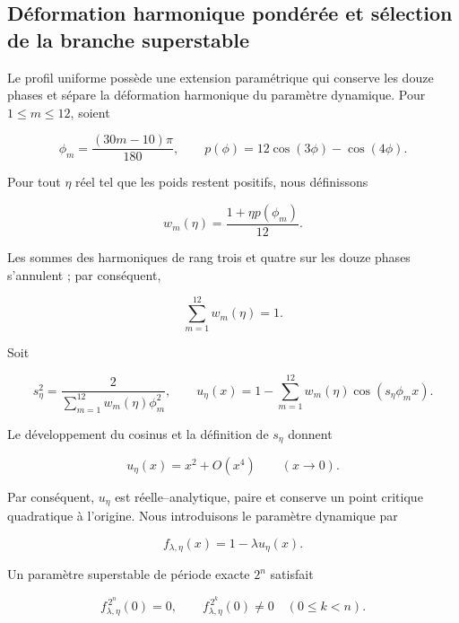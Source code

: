 \subsection{Déformation harmonique pondérée et sélection de la branche superstable}
\label{mab:sec:extension-dodecafasica-ponderada-armonica}

Le profil uniforme possède une extension paramétrique qui conserve les douze
phases et sépare la déformation harmonique du paramètre dynamique. Pour
\(1\le m\le12\), soient

\begin{equation}
 \phi_m=\frac{(30m-10)\pi}{180},
 \qquad
 p(\phi)=12\cos(3\phi)-\cos(4\phi).
 \label{mab:eq:fases-y-deformacion-armonica-armonizada}
\end{equation}

Pour tout \(\eta\) réel tel que les poids restent positifs, nous définissons

\begin{equation}
 w_m(\eta)=\frac{1+\eta p(\phi_m)}{12}.
 \label{mab:eq:pesos-dodecafasicos-armonizados}
\end{equation}

Les sommes des harmoniques de rang trois et quatre sur les douze phases s’annulent ;
par conséquent,

\[
 \sum_{m=1}^{12}w_m(\eta)=1.
\]

Soit

\begin{equation}
 s_\eta^2=\frac{2}{\sum_{m=1}^{12}w_m(\eta)\phi_m^2},
 \qquad
 u_\eta(x)=1-\sum_{m=1}^{12}w_m(\eta)
 \cos(s_\eta\phi_m x).
 \label{mab:eq:familia-ponderada-armonizada}
\end{equation}

Le développement du cosinus et la définition de \(s_\eta\) donnent

\[
 u_\eta(x)=x^2+O(x^4)\qquad(x\to0).
\]

Par conséquent, \(u_\eta\) est réelle--analytique, paire et conserve un point
critique quadratique à l’origine. Nous introduisons le paramètre dynamique par

\begin{equation}
 f_{\lambda,\eta}(x)=1-\lambda u_\eta(x).
 \label{mab:eq:familia-feigenbaum-ponderada-armonizada}
\end{equation}

Un paramètre superstable de période exacte \(2^n\) satisfait

\[
 f_{\lambda,\eta}^{\,2^n}(0)=0,
 \qquad
 f_{\lambda,\eta}^{\,2^k}(0)\ne0\quad(0\le k<n).
\]

